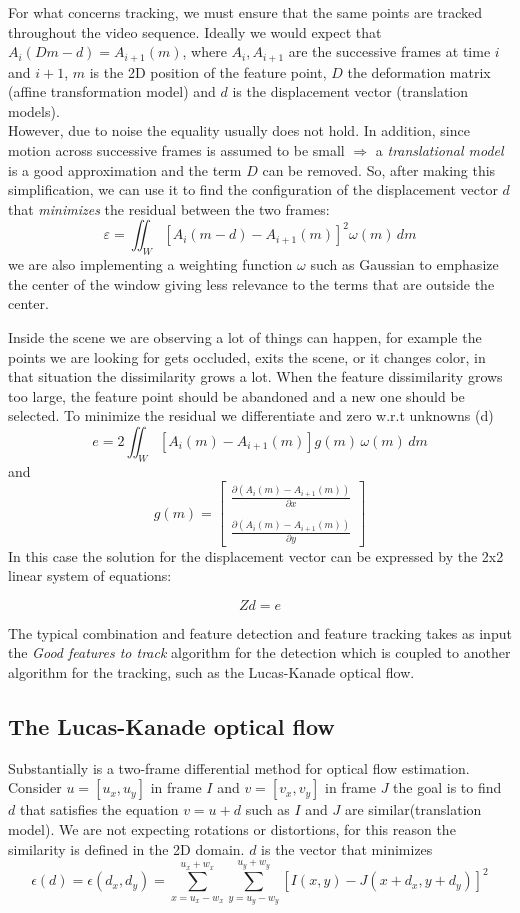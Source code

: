 For what concerns tracking, we must ensure that the same points are tracked throughout the video sequence. 
Ideally we would expect that $A_i(Dm-d)=A_{i+1}(m)$, where $A_i, A_{i+1}$ are the successive frames at time $i$ and $i+1$, $m$ is the 2D position of the feature point, $D$ the deformation matrix (affine transformation model) and $d$ is the displacement vector (translation models).
\\ However, due to noise the equality usually does not hold. In addition, since motion across successive frames is assumed to be small $\Rightarrow$ a \textit{translational model} is a good approximation and the term $D$ can be removed. So, after making this simplification, we can use it to find the configuration of the displacement vector $d$ that \textit{minimizes} the residual between the two frames:
\[
    \varepsilon = \iint_{W} \left[A_i(m-d)-A_{i+1}(m)\right]^2 \omega(m) \, dm
\]
we are also implementing a weighting function $\omega$ such as Gaussian to emphasize the center of the window giving less relevance to the terms that are outside the center.

Inside the scene we are observing a lot of things can happen, for example the points we are looking for gets occluded, exits the scene, or it changes color, in that situation the dissimilarity grows a lot. When the feature dissimilarity grows too large, the feature point should be abandoned and a new one should be selected.
To minimize the residual we differentiate and zero w.r.t unknowns (d)
\[
    e = 2 \iint_{W} \left[A_i(m)-A_{i+1}(m)\right]g(m) \, \omega(m) \, dm
\] 
and 
\[
    g(m)=\begin{bmatrix}
        \frac{\partial (A_i(m)-A_{i+1}(m))}{\partial x} \\
        \\
        \frac{\partial (A_i(m)-A_{i+1}(m))}{\partial y} 
    \end{bmatrix}
\]
In this case the solution for the displacement vector can be expressed by the 2x2 linear system of equations:

\[
    Zd = e
\]

The typical combination and feature detection and feature tracking takes as input the \textit{Good features to track} algorithm for the detection which is coupled to another algorithm for the tracking, such as the Lucas-Kanade optical flow.

\subsection{The Lucas-Kanade optical flow}
Substantially is a two-frame differential method for optical flow estimation.
Consider $u=[u_x, u_y]$ in frame $I$ and $v=[v_x, v_y]$ in frame $J$ the goal is to find $d$ that satisfies the equation $v = u + d$ such as $I$ and $J$ are similar(translation model).
We are not expecting rotations or distortions, for this reason the similarity is defined in the 2D domain.
$d$ is the vector that minimizes
\[
    \epsilon(d) = \epsilon(d_x, d_y) = \sum_{x=u_x-w_x}^{u_x+w_x} \sum_{y=u_y-w_y}^{u_y+w_y} \left[I(x, y) - J(x+d_x, y+d_y)\right]^2
\]


